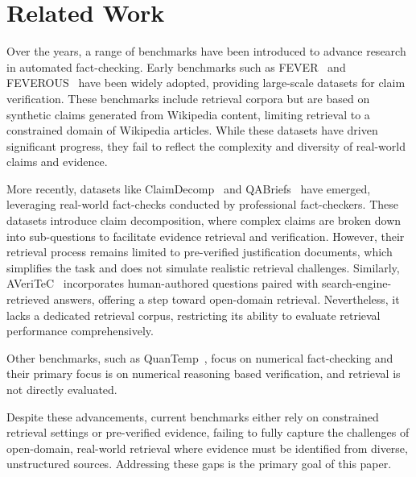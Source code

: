 \section{Related Work}
Over the years, a range of benchmarks have been introduced to advance research in automated fact-checking. Early benchmarks such as FEVER~\cite{thorne-etal-2018-fever} and FEVEROUS~\cite{aly2021feverous} have been widely adopted, providing large-scale datasets for claim verification. These benchmarks include retrieval corpora but are based on synthetic claims generated from Wikipedia content, limiting retrieval to a constrained domain of Wikipedia articles. While these datasets have driven significant progress, they fail to reflect the complexity and diversity of real-world claims and evidence.

More recently, datasets like ClaimDecomp~\cite{claimdecomp} and QABriefs~\cite{QABriefs} have emerged, leveraging real-world fact-checks conducted by professional fact-checkers. These datasets introduce claim decomposition, where complex claims are broken down into sub-questions to facilitate evidence retrieval and verification. However, their retrieval process remains limited to pre-verified justification documents, which simplifies the task and does not simulate realistic retrieval challenges. Similarly, AVeriTeC~\cite{schlichtkrull2023averitec} incorporates human-authored questions paired with search-engine-retrieved answers, offering a step toward open-domain retrieval. Nevertheless, it lacks a dedicated retrieval corpus, restricting its ability to evaluate retrieval performance comprehensively.

Other benchmarks, such as QuanTemp~\cite{10.1145/3626772.3657874}, focus on numerical fact-checking and their primary focus is on numerical reasoning based verification, and retrieval is not directly evaluated. 

Despite these advancements, current benchmarks either rely on constrained retrieval settings or pre-verified evidence, failing to fully capture the challenges of open-domain, real-world retrieval where evidence must be identified from diverse, unstructured sources. Addressing these gaps is the primary goal of this paper.